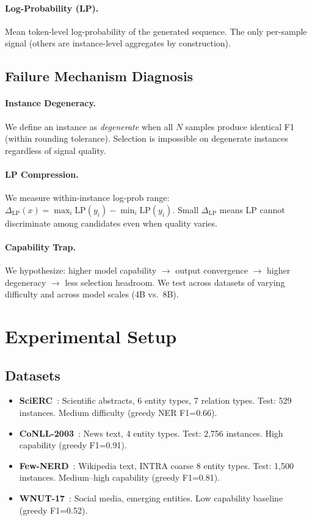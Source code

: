 \documentclass[11pt]{article}
\begin{document}
\paragraph{Log-Probability (LP).} Mean token-level log-probability of the generated sequence. The only per-sample signal (others are instance-level aggregates by construction).

\subsection{Failure Mechanism Diagnosis}

\paragraph{Instance Degeneracy.} We define an instance as \emph{degenerate} when all $N$ samples produce identical F1 (within rounding tolerance). Selection is impossible on degenerate instances regardless of signal quality.

\paragraph{LP Compression.} We measure within-instance log-prob range: $\Delta_{\text{LP}}(x) = \max_i \text{LP}(y_i) - \min_i \text{LP}(y_i)$. Small $\Delta_{\text{LP}}$ means LP cannot discriminate among candidates even when quality varies.

\paragraph{Capability Trap.} We hypothesize: higher model capability $\rightarrow$ output convergence $\rightarrow$ higher degeneracy $\rightarrow$ less selection headroom. We test across datasets of varying difficulty and across model scales (4B vs.\ 8B).

\section{Experimental Setup}

\subsection{Datasets}

\begin{itemize}
\item \textbf{SciERC}~\cite{luan2018scierc}: Scientific abstracts, 6 entity types, 7 relation types. Test: 529 instances. Medium difficulty (greedy NER F1=0.66).
\item \textbf{CoNLL-2003}~\cite{sang2003conll}: News text, 4 entity types. Test: 2,756 instances. High capability (greedy F1=0.91).
\item \textbf{Few-NERD}~\cite{ding2021fewnerd}: Wikipedia text, INTRA coarse 8 entity types. Test: 1,500 instances. Medium--high capability (greedy F1=0.81).
\item \textbf{WNUT-17}~\cite{derczynski2017wnut}: Social media, emerging entities. Low capability baseline (greedy F1=0.52).
\end{itemize}
\end{document}
